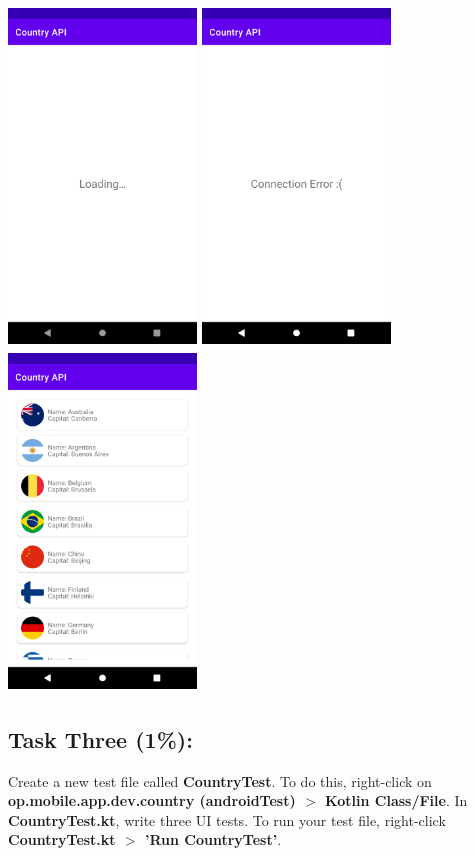 \documentclass{article}
\begin{document}
\includegraphics[width=5cm, height=9cm]{../tex/img/practicals/04-country-api-1.png} 
\includegraphics[width=5cm, height=9cm]{../tex/img/practicals/04-country-api-2.png}
\includegraphics[width=5cm, height=9cm]{../tex/img/practicals/04-country-api-3.png} \\

\subsection*{Task Three (1\%):}
Create a new test file called \textbf{CountryTest}. To do this, right-click on \textbf{op.mobile.app.dev.country (androidTest) $>$ Kotlin Class/File}. In \textbf{CountryTest.kt}, write three UI tests. To run your test file, right-click \textbf{CountryTest.kt $>$ 'Run CountryTest'}.
\end{document}
